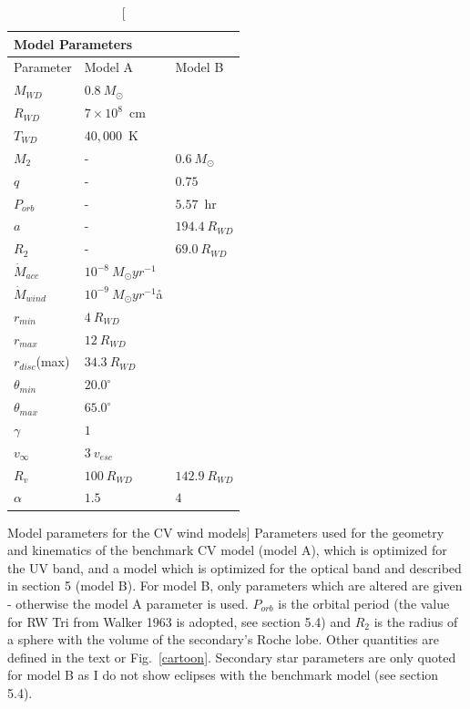 \begin{table}
\centering
\begin{tabular}{p{2cm}p{2cm}p{2cm}}
\multicolumn{2}{|l|}{Model Parameters}  \\
\hline Parameter 	&	 Model A  & Model B \\ 
\hline \hline 
$M_{WD}$ 	 &	 $0.8~M_{\odot}$  &     \\ 
$R_{WD}$ 	 &	 $7\times10^{8}$~cm  & \\ 
$T_{WD}$ 	 &	 $40,000$~K        &  \\
$M_{2}$ 	& -&	 $0.6~M_{\odot}$   \\ 
$q$ 	&- &	 $0.75$   \\ 
$P_{orb}$ 	&- &	 $5.57$~hr   \\ 
$a$ 	& -&	 $194.4~R_{WD}$   \\ 
$R_2$   &   -  &	 $69.0~R_{WD}$  \\ 
$\dot{M}_{acc}$ 	 &	 $10^{-8}~M_{\odot}yr^{-1}$  &\\ 
$\dot{M}_{wind}$  &	$10^{-9}~M_{\odot}yr^{-1}$å  & \\ 
$r_{min}$ 	&	 $4~R_{WD}$ &  \\ 
$r_{max}$ 	&	 $12~R_{WD}$  &  \\ 
$r_{disc}$(max) 	&	 $34.3~R_{WD}$  &  \\ 
$\theta_{min}$ 	&	 $20.0^{\circ}$  &  \\ 
$\theta_{max}$ 	&	 $65.0^{\circ}$  &  \\ 
$\gamma$ 	&	 $1$  &  \\ 
$v_{\infty}$ 	&	 $3~v_{esc}$  &  \\ 
$R_v$ 	        &	 $100~R_{WD}$  &  $142.9~R_{WD}$  \\ 
$\alpha$ 	&	 $1.5$   &   $4$\\
\end{tabular}
\centering
\caption
[Model parameters for the CV wind models]
{
Parameters used for the geometry and kinematics of the benchmark 
CV model (model A), which is optimized for the UV band, and a model
which is optimized for the optical band and described in section 5 (model B).
For model B, only parameters which are altered are given - otherwise the
model A parameter is used. $P_{orb}$ is the orbital period 
(the value for RW Tri from Walker 1963 is adopted, see section 5.4) and 
$R_2$ is the radius of a sphere with the volume of the secondary's Roche lobe. 
Other quantities are defined in the text or Fig.~\ref{cartoon}.
Secondary star parameters are only quoted for 
model B as I do not show eclipses with the 
benchmark model (see section 5.4).
}
\label{wind_param}
\label{modelb_table}
\end{table}

